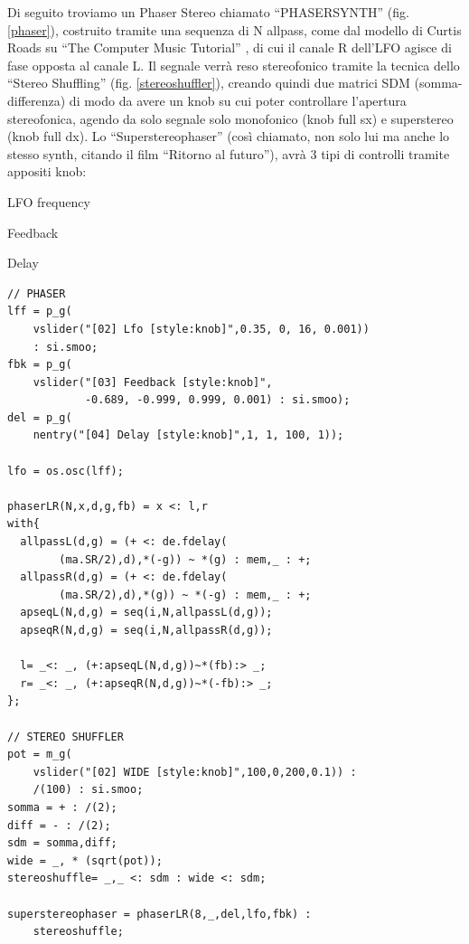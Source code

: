 \documentclass[
	a4paper,
	twocolumn
	]{article}
\begin{document}
Di seguito troviamo un Phaser Stereo chiamato “PHASERSYNTH” (fig. \ref{phaser}),
costruito tramite una sequenza di N allpass, come dal modello di Curtis Roads su
“The Computer Music Tutorial” \cite{cr96cmt}, di cui il canale R dell'LFO agisce di fase opposta al
canale L. Il segnale verrà reso stereofonico tramite la tecnica dello
“Stereo Shuffling” (fig. \ref{stereoshuffler}), creando quindi due matrici SDM \cite{ab58} (somma-differenza) di
modo da avere un knob su cui poter controllare l'apertura stereofonica, agendo da solo segnale solo
monofonico (knob full sx) e superstereo (knob full dx). Lo “Superstereophaser”
(così chiamato, non solo lui ma anche lo stesso synth, citando il film “Ritorno al futuro”), avrà 3 tipi di controlli
tramite appositi knob:
\begin{compactitem}
\item LFO frequency
\item Feedback
\item Delay
\end{compactitem}



\begin{lstlisting}
// PHASER
lff = p_g(
	vslider("[02] Lfo [style:knob]",0.35, 0, 16, 0.001))
	: si.smoo;
fbk = p_g(
	vslider("[03] Feedback [style:knob]",
	        -0.689, -0.999, 0.999, 0.001) : si.smoo);
del = p_g(
	nentry("[04] Delay [style:knob]",1, 1, 100, 1));

lfo = os.osc(lff);

phaserLR(N,x,d,g,fb) = x <: l,r
with{
  allpassL(d,g) = (+ <: de.fdelay(
		(ma.SR/2),d),*(-g)) ~ *(g) : mem,_ : +;
  allpassR(d,g) = (+ <: de.fdelay(
		(ma.SR/2),d),*(g)) ~ *(-g) : mem,_ : +;
  apseqL(N,d,g) = seq(i,N,allpassL(d,g));
  apseqR(N,d,g) = seq(i,N,allpassR(d,g));

  l= _<: _, (+:apseqL(N,d,g))~*(fb):> _;
  r= _<: _, (+:apseqR(N,d,g))~*(-fb):> _;
};

// STEREO SHUFFLER
pot = m_g(
	vslider("[02] WIDE [style:knob]",100,0,200,0.1)) :
	/(100) : si.smoo;
somma = + : /(2);
diff = - : /(2);
sdm = somma,diff;
wide = _, * (sqrt(pot));
stereoshuffle= _,_ <: sdm : wide <: sdm;

superstereophaser = phaserLR(8,_,del,lfo,fbk) :
	stereoshuffle;
\end{lstlisting}
\end{document}

